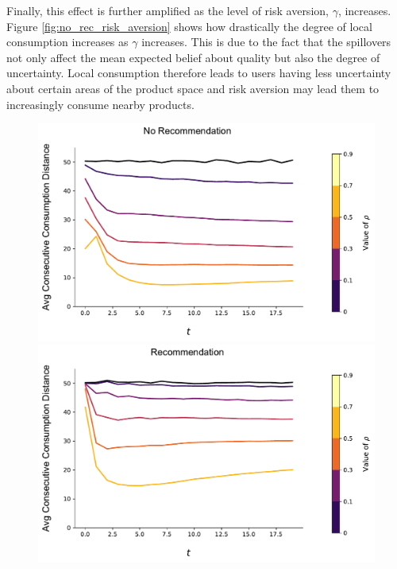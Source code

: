 \documentclass[sigconf]{acmart}
\begin{document}
Finally, this effect is further amplified as the level of risk aversion, $\gamma$, increases. Figure \ref{fig:no_rec_risk_aversion} shows how drastically the degree of local consumption increases as $\gamma$ increases. This is due to the fact that the spillovers not only affect the mean expected belief about quality but also the degree of uncertainty. Local consumption therefore leads to users having less uncertainty about certain areas of the product space and risk aversion may lead them to increasingly consume nearby products.

\begin{figure}[t]
\includegraphics[width=\linewidth]{figures/rho_consumption_dist_N_200T_20.pdf}\\
\includegraphics[width=\linewidth]{figures/rho_consumption_dist_N_200T_20_partial.pdf}\\

\end{figure}
\end{document}
